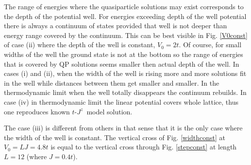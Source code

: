 \documentclass[%
 reprint,
 amsmath,amssymb,
 aps,
prb,
floatfix,
]{revtex4-1}
\begin{document}
The range of energies where the quasiparticle solutions may exist corresponds to the depth of the potential well. For energies exceeding depth of the well potential there is always a continuum of states provided that well is not deeper than energy range covered by the continuum. This can be best visible in Fig. \ref{V0const} of case (ii) where the depth of the well is constant, $V_0 = 2t$. Of course, for small widths of the well the ground state is not at the bottom so the range of energies that is covered by QP solutions seems smaller then actual depth of the well. In cases (i) and (ii), when the width of the well is rising more and more solutions fit in the well while distances between them get smaller and smaller. In the thermodynamic limit when the well totally disappears the continuum rebuilds. In case (iv) in thermodynamic limit the linear potential covers whole lattice, thus one reproduces known $t\text{-}J^z$~model solution.

The case (iii) is different from others in that sense that it is the only case where the width of the well is constant. The vertical cross of Fig. \ref{widthconst} at $V_0 = LJ = 4.8t$ is equal to the vertical cross through Fig. \ref{stepconst} at length $L = 12$ (where $J = 0.4t$).
\end{document}
